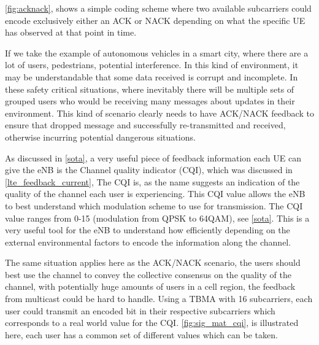 \documentclass{article}
\begin{document}
\cref{fig:acknack}, shows a simple coding scheme where two available subcarriers could encode exclusively either an ACK or NACK depending on what the specific UE has observed at that point in time.

If we take the example of autonomous vehicles in a smart city, where there are a lot of users, pedestrians, potential interference. In this kind of environment, it may be understandable that some data received is corrupt and incomplete. In these safety critical situations, where inevitably there will be multiple sets of grouped users who would be receiving many messages about updates in their environment. This kind of scenario clearly needs to have ACK/NACK feedback to ensure that dropped message and successfully re-transmitted and received, otherwise incurring potential dangerous situations. 


As discussed in \cref{sota}, a very useful piece of feedback information each UE can give the eNB is the Channel quality indicator (CQI), which was discussed in \cref{lte_feedback_current}, The CQI is, as the name suggests an indication of the quality of the channel each user is experiencing. This CQI value allows the eNB to best understand which modulation scheme to use for transmission. The CQI value ranges from 0-15 (modulation from QPSK to 64QAM), see \cref{sota}. This is a very useful tool for the eNB to understand how efficiently depending on the external environmental factors to encode the information along the channel. 

The same situation applies here as the ACK/NACK scenario, the users should best use the channel to convey the collective consensus on the quality of the channel, with potentially huge amounts of users in a cell region, the feedback from multicast could be hard to handle. Using a TBMA with 16 subcarriers, each user could transmit an encoded bit in their respective subcarriers which corresponds to a real world value for the CQI. \cref{fig:sig_mat_cqi}, is illustrated here, each user has a common set of different values which can be taken. 
\end{document}
